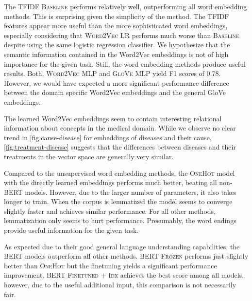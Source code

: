 The TFIDF \textsc{Baseline} performs relatively well, outperforming all word embedding methods. This is surprising given the simplicity of the method. The TFIDF features appear more useful than the more sophisticated word embeddings, especially considering that \textsc{Word2Vec LR} performs much worse than \textsc{Baseline} despite using the same logistic regression classifier. We hypothesize that the semantic information contained in the Word2Vec embeddings is not of high importance for the given task.
Still, the word embedding methods produce useful results. Both, \textsc{Word2Vec MLP} and \textsc{GloVe MLP} yield F1 scores of 0.78. However, we would have expected a more significant performance difference between the domain specific Word2Vec embeddings and the general GloVe embeddings.

The learned Word2Vec embeddings seem to contain interesting relational information about concepts in the medical domain. While we observe no clear trend in \autoref{fig:cause-disease} for embeddings of diseases and their cause, \autoref{fig:treatment-disease} suggests that the differences between diseases and their treatments in the vector space are generally very similar.

Compared to the unsupervised word embedding methods, the \textsc{OneHot} model with the directly learned embeddings performs much better, beating all non-BERT models. However, due to the larger number of parameters, it also takes longer to train. When the corpus is lemmatized the model seems to converge slightly faster and achieves similar performance. For all other methods, lemmatization only seems to hurt performance. Presumably, the word endings provide useful information for the given task.

As expected due to their good general language understanding capabilities, the BERT models outperform all other methods. \textsc{BERT Frozen} performs just slightly better than \textsc{OneHot} but the finetuning yields a significant performance improvement. \textsc{BERT Finetuned + Idx} achieves the best score among all models, however, due to the useful additional input, this comparison is not necessarily fair.

